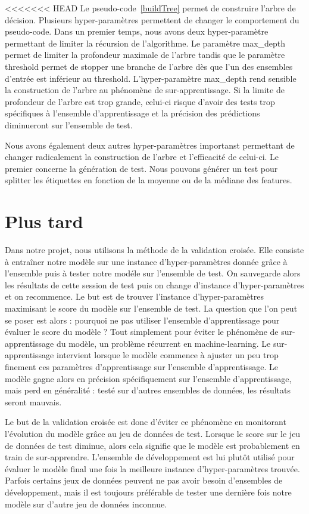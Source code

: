 \documentclass[french, 14pt]{memoir}
\begin{document}
<<<<<<< HEAD
Le pseudo-code~\ref{buildTree} permet de construire l'arbre de décision. Plusieurs hyper-paramètres permettent de changer le comportement du pseudo-code. Dans un premier temps, nous avons deux hyper-paramètre permettant de limiter la récursion de l'algorithme. Le paramètre max\_depth permet de limiter la profondeur maximale de l'arbre tandis que le paramètre threshold permet de stopper une branche de l'arbre dès que l'un des ensembles d'entrée est inférieur au threshold. L'hyper-paramètre max\_depth rend sensible la construction de l'arbre au phénomène de sur-apprentissage. Si la limite de profondeur de l'arbre est trop grande, celui-ci risque d'avoir des tests trop spécifiques à l'ensemble d'apprentissage et la précision des prédictions diminueront sur l'ensemble de test.

Nous avons également deux autres hyper-paramètres importanst permettant de changer radicalement la construction de l'arbre et l'efficacité de celui-ci. Le premier concerne la génération de test. Nous pouvons générer un test pour splitter les étiquettes en fonction de la moyenne ou de la médiane des features. 

\chapter*{Plus tard}

Dans notre projet, nous utilisons la méthode de la validation croisée. Elle consiste à entraîner notre modèle sur une instance d'hyper-paramètres donnée grâce à l'ensemble puis à tester notre modéle sur l'ensemble de test. On sauvegarde alors les résultats de cette session de test puis on change d'instance d'hyper-paramètres et on recommence. Le but est de trouver l'instance d'hyper-paramètres maximisant le score du modèle sur l'ensemble de test.
La question que l'on peut se poser est alors : pourquoi ne pas utiliser l'ensemble d'apprentissage pour évaluer le score du modèle ? 
Tout simplement pour éviter le phénomène de sur-apprentissage du modèle, un problème récurrent en machine-learning. Le sur-apprentissage intervient lorsque le modèle commence à ajuster un peu trop finement ces paramètres d'apprentissage sur l'ensemble d'apprentissage. Le modèle gagne alors en précision spécifiquement sur l'ensemble d'apprentissage, mais perd en généralité : testé sur d'autres ensembles de données, les résultats seront mauvais.

Le but de la validation croisée est donc d'éviter ce phénomène en monitorant l'évolution du modèle grâce au jeu de données de test. Lorsque le score sur le jeu de données de test diminue, alors cela signifie que le modèle est probablement en train de sur-apprendre. 
L'ensemble de développement est lui plutôt utilisé pour évaluer le modèle final une fois la meilleure instance d'hyper-paramètres trouvée. Parfois certains jeux de données peuvent ne pas avoir besoin d'ensembles de développement, mais il est toujours préférable de tester une dernière fois notre modèle sur d'autre jeu de données inconnue. 
\end{document}
